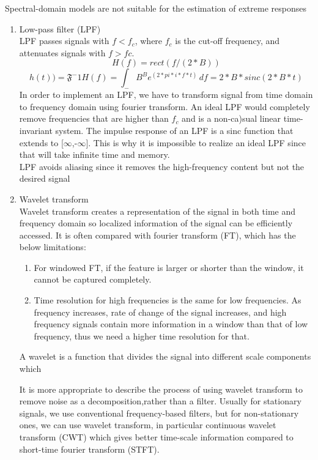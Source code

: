 Spectral-domain models are not suitable for the estimation of extreme responses
\begin{enumerate}
	\item Low-pass filter (LPF)\\
	LPF passes signals with \(f<f_{c}\), where \(f_{c}\) is the cut-off frequency, and attenuates
	signals with \(f>fc\). 
	\[H(f) = rect(f/(2*B))\]
	\[h(t))= \mathfrak{F}^-1{H(f)} = \int_-B^B e^(2*pi*i*f*t)\,df = 2*B*sinc(2*B*t)\]
	In order to implement an LPF, we have to transform signal from time domain to 
	frequency domain using fourier transform. An ideal LPF would completely remove frequencies that are
	higher than \(f_{c}\) and is a non-ca)sual linear time-invariant system. The impulse
	response of an LPF is a sinc function that extends to [$\infty$,-$\infty$]. This is why it is impossible to 
	realize an ideal LPF since that will take infinite time and memory.\\
	LPF avoids aliasing since it removes the high-frequency content but not the desired signal

	\item Wavelet transform\\
	Wavelet transform creates a representation of the signal in both time and frequency domain so localized 
	information of the signal can be efficiently accessed. It is often compared with fourier transform (FT), which
	has the below limitations: 
	\begin{enumerate}
		\item For windowed FT, if the feature is larger or shorter than the window, it cannot be captured completely.
		\item Time resolution for high frequencies is the same for low frequencies. As frequency increases, rate of 
		change of the signal increases, and high frequency signals contain more information in a window than that of 
		low frequency, thus we need a higher time resolution for that.
	\end{enumerate}
	A wavelet is a function that divides the signal into different scale components which 
	
	
	It is more appropriate to describe the process of using wavelet transform to remove noise as a decomposition,rather 
	than a filter.
	Usually for stationary signals, we use conventional frequency-based filters, but for non-stationary ones, we can 
	use wavelet transform, in particular continuous wavelet transform (CWT) which gives better time-scale information
	compared to short-time fourier transform (STFT). 
 

\end{enumerate}
